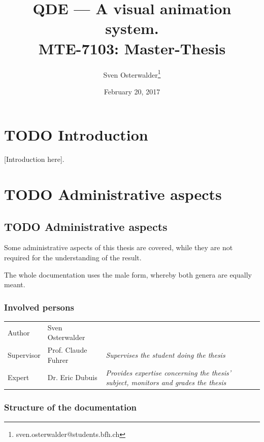 \documentclass[10pt, openright, notitlepage]{scrreprt}
\author{Sven Osterwalder\thanks{sven.osterwalder@students.bfh.ch}}
\date{February 20, 2017}
\title{QDE --- A visual animation system.\\\medskip
\large MTE-7103: Master-Thesis}
\begin{document}
\maketitle
\tableofcontents



\chapter{{\bfseries\sffamily TODO} Introduction}
\label{sec:org4851918}
[Introduction here].
\chapter{{\bfseries\sffamily TODO} Administrative aspects}
\label{sec:orgc916737}
\section{{\bfseries\sffamily TODO} Administrative aspects}
\label{sec:org43a7b40}

Some administrative aspects of this thesis are covered, while they are not
required for the understanding of the result.

The whole documentation uses the male form, whereby both genera are equally
meant.

\subsection{Involved persons}
\label{sec:org4363b2f}

\begin{center}
\begin{tabular}{lll}
Author & Sven Osterwalder\footnotemark & \\
Supervisor & Prof. Claude Fuhrer\footnotemark & \emph{Supervises the student doing the thesis}\\
Expert & Dr. Eric Dubuis\footnotemark & \emph{Provides expertise concerning the thesis' subject, monitors and grades the thesis}\\
\end{tabular}
\end{center}

\subsection{Structure of the documentation}
\label{sec:org66f88a2}
\end{document}
